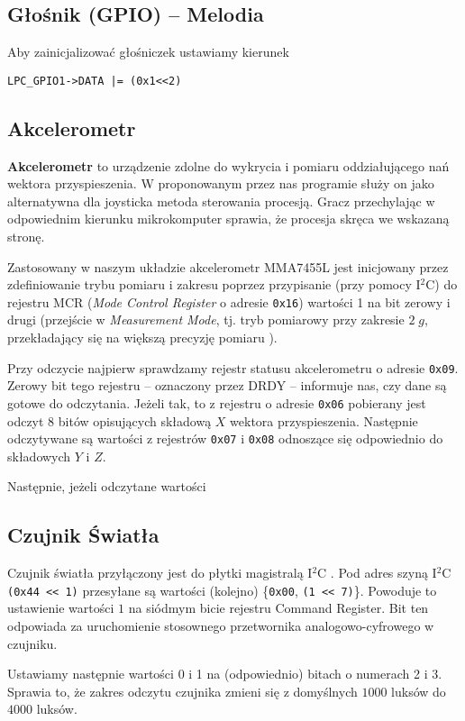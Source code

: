\documentclass[a4paper,12pt,twoside]{article}
\theoremstyle{plain}
\theoremstyle{definition}
\theoremstyle{remark}
\begin{document}
\subsection{Głośnik (GPIO) -- Melodia}
Aby zainicjalizować głośniczek ustawiamy kierunek 
\begin{verbatim}
LPC_GPIO1->DATA |= (0x1<<2)
\end{verbatim}

\subsection{Akcelerometr}
\textbf{Akcelerometr} to urządzenie zdolne do wykrycia i pomiaru oddziałującego nań wektora przyspieszenia. W proponowanym przez nas programie służy on jako alternatywna dla joysticka metoda sterowania procesją. Gracz przechylając w odpowiednim kierunku mikrokomputer sprawia, że procesja skręca we wskazaną stronę.

Zastosowany w naszym układzie akcelerometr MMA7455L jest inicjowany przez zdefiniowanie trybu pomiaru i zakresu poprzez przypisanie (przy pomocy I$^2$C) do rejestru MCR (\textit{Mode Control Register} o adresie \verb|0x16|) wartości 1 na bit zerowy i drugi (przejście w \textit{Measurement Mode}, tj. tryb pomiarowy przy zakresie $2 \; g$, przekładający się na większą precyzję pomiaru \cite{ACCEL}).

Przy odczycie najpierw sprawdzamy rejestr statusu akcelerometru o adresie \verb|0x09|. Zerowy bit tego rejestru -- oznaczony przez DRDY -- informuje nas, czy dane są gotowe do odczytania. Jeżeli tak, to z rejestru o adresie \verb|0x06| pobierany jest  
odczyt $8$ bitów opisujących składową $X$ wektora przyspieszenia. Następnie odczytywane są wartości z rejestrów \verb|0x07| i \verb|0x08| odnoszące się odpowiednio do składowych $Y$ i $Z$.

Następnie, jeżeli odczytane wartości 

\subsection{Czujnik \'Swiatła}
Czujnik światła przyłączony jest do płytki magistralą I$^2$C \cite{LUX}. Pod adres szyną I$^2$C \verb|(0x44 << 1)| przesyłane są wartości (kolejno) \{\verb|0x00|, \verb|(1 << 7)|\}. Powoduje to ustawienie wartości $1$ na siódmym bicie rejestru Command Register. Bit ten odpowiada za uruchomienie stosownego przetwornika analogowo-cyfrowego w czujniku.

Ustawiamy następnie wartości 0 i 1 na (odpowiednio) bitach o numerach 2 i 3. Sprawia to, że zakres odczytu czujnika zmieni się z domyślnych $1000$ luksów do $4000$ luksów.
\end{document}
